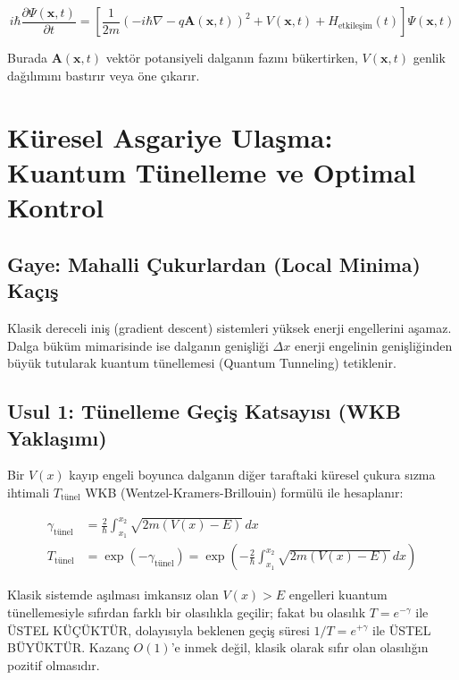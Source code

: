 \documentclass[11pt, a4paper]{article}
\begin{document}
\begin{equation}
i\hbar \frac{\partial \Psi(\mathbf{x}, t)}{\partial t} = \left[ \frac{1}{2m} \left( -i\hbar \nabla - q \mathbf{A}(\mathbf{x}, t) \right)^2 + V(\mathbf{x}, t) + H_{\text{etkileşim}}(t) \right] \Psi(\mathbf{x}, t)
\end{equation}

Burada $\mathbf{A}(\mathbf{x}, t)$ vektör potansiyeli dalganın fazını bükertirken, $V(\mathbf{x}, t)$ genlik dağılımını bastırır veya öne çıkarır.

\section{Küresel Asgariye Ulaşma: Kuantum Tünelleme ve Optimal Kontrol}

\subsection{Gaye: Mahalli Çukurlardan (Local Minima) Kaçış}
Klasik dereceli iniş (gradient descent) sistemleri yüksek enerji engellerini aşamaz. Dalga büküm mimarisinde ise dalganın genişliği $\Delta x$ enerji engelinin genişliğinden büyük tutularak kuantum tünellemesi (Quantum Tunneling) tetiklenir.

\subsection{Usul 1: Tünelleme Geçiş Katsayısı (WKB Yaklaşımı)}
Bir $V(x)$ kayıp engeli boyunca dalganın diğer taraftaki küresel çukura sızma ihtimali $T_{\text{tünel}}$ WKB (Wentzel-Kramers-Brillouin) formülü ile hesaplanır:

\begin{align}
\gamma_{\text{tünel}} &= \frac{2}{\hbar} \int_{x_1}^{x_2} \sqrt{2m (V(x) - E)} \, dx \\
T_{\text{tünel}} &= \exp\left( -\gamma_{\text{tünel}} \right) = \exp\left( -\frac{2}{\hbar} \int_{x_1}^{x_2} \sqrt{2m (V(x) - E)} \, dx \right)
\end{align}

Klasik sistemde aşılması imkansız olan $V(x) > E$ engelleri kuantum tünellemesiyle sıfırdan farklı bir olasılıkla geçilir; fakat bu olasılık $T = e^{-\gamma}$ ile ÜSTEL KÜÇÜKTÜR, dolayısıyla beklenen geçiş süresi $1/T = e^{+\gamma}$ ile ÜSTEL BÜYÜKTÜR. Kazanç $O(1)$'e inmek değil, klasik olarak sıfır olan olasılığın pozitif olmasıdır.
\end{document}
